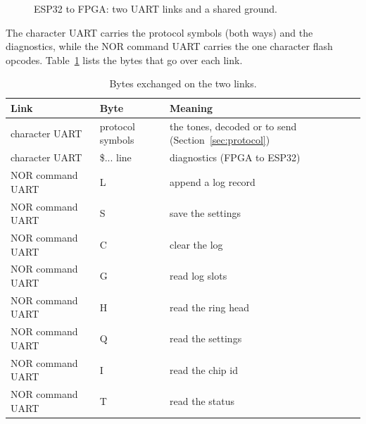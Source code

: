 \documentclass[a4paper,10pt]{article}
\begin{document}
\begin{figure}[H]
\centering
{}
\caption{ESP32 to FPGA: two UART links and a shared ground.}
\label{fig:esp-link}
\end{figure}

The character UART carries the protocol symbols (both ways) and the diagnostics, while the
NOR command UART carries the one character flash opcodes. Table~\ref{tab:esp-opcodes} lists
the bytes that go over each link.

\begin{table}[H]
\centering
\caption{Bytes exchanged on the two links.}
\label{tab:esp-opcodes}
\begin{tabular}{lll}
\hline
Link & Byte & Meaning \\
\hline
character UART & protocol symbols & the tones, decoded or to send (Section~\ref{sec:protocol}) \\
character UART & \$... line & diagnostics (FPGA to ESP32) \\
NOR command UART & L & append a log record \\
NOR command UART & S & save the settings \\
NOR command UART & C & clear the log \\
NOR command UART & G & read log slots \\
NOR command UART & H & read the ring head \\
NOR command UART & Q & read the settings \\
NOR command UART & I & read the chip id \\
NOR command UART & T & read the status \\
\hline
\end{tabular}
\end{table}
\end{document}

